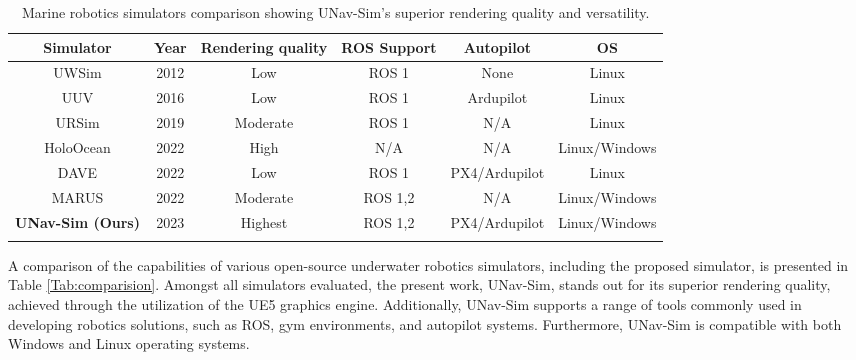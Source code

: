 \begin{table*}[t]
\caption{Marine robotics simulators comparison showing UNav-Sim's superior rendering quality and versatility.}
\centering


\begin{tabular}{ cccccc}


\toprule


Simulator & Year & Rendering  quality &ROS Support& Autopilot & OS 
\\
\midrule

UWSim \cite{uwsim} & 2012 &Low& ROS 1 & None & Linux \\

UUV \cite{uuv} &2016 & Low& ROS 1 & Ardupilot & Linux 
 \\

URSim \cite{ursim} & 2019 & Moderate & ROS 1 & N/A& Linux \\

HoloOcean \cite{holoocean} & 2022 & High  & N/A& N/A  & Linux/Windows  \\

DAVE \cite{dave}& 2022 &Low &  ROS 1& PX4/Ardupilot  &Linux  \\

MARUS \cite{marus} & 2022 & Moderate & ROS 1,2 & N/A & Linux/Windows
  \\
\midrule

\textbf{UNav-Sim (Ours)} &2023 & Highest & ROS 1,2 & PX4/Ardupilot &  Linux/Windows \\
\bottomrule

\label{Tab:comparision}

\end{tabular}


\label{Tab:comparision2}
\end{table*}
%

A comparison of the capabilities of various open-source underwater robotics simulators, including the proposed simulator, is presented in Table \ref{Tab:comparision}. Amongst all simulators evaluated, the present work, UNav-Sim, stands out for its superior rendering quality, achieved through the utilization of the \ac{UE}5 graphics engine. Additionally, UNav-Sim supports a range of tools commonly used in developing robotics solutions, such as \ac{ROS}, gym environments, and autopilot systems. Furthermore, UNav-Sim is compatible with both Windows and Linux operating systems.

